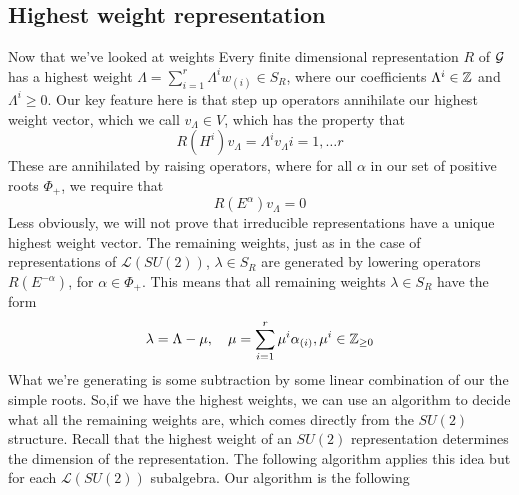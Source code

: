  \subsection{Highest weight representation}
 Now that we've looked at weights 
 Every finite dimensional representation $ R $ of $ \mathcal{ G } $ 
 has a highest weight $ \Lambda = \sum _{ i = 1 } ^ r \Lambda ^ i w _{ \left( i  \right)  }  
 \in S _ R $, where our coefficients $ \Lambda^ i \in \mathbb{Z}  $ and 
 $ \Lambda ^ i \ge  0 $. 
 Our key feature here is that step up operators 
 annihilate our highest weight vector, which 
 we call $ v _{ \Lambda } \in V $, which has 
 the property that 
 \[
  R \left( H ^ i  \right)  v _{ \Lambda } = \Lambda ^ i v _{ \Lambda } i  = 1, \dots r 
 \] These are annihilated by raising operators, 
 where for all $ \alpha $ in our set of positive roots $ \Phi  _ + $, 
 we require that 
 \[
  R \left( E ^{ \alpha }  \right)  v _{ \Lambda } = 0 
 \] Less obviously, we will not prove that irreducible 
 representations have a unique highest weight vector. 
 The remaining weights, just as in the case of 
 representations of $ \mathcal{ L } \left( SU ( 2)   \right)  $,
 $ \lambda \in  S_ R $ are generated by lowering operators 
 $ R \left( E ^{ - \alpha }  \right)  $, for $ \alpha \in \Phi   _ + $. 
This means that all remaining weights $ \lambda \in S _ R $
have the form 
\[
	\lambda = \Lambda - \mu , \quad \mu = \sum_{ i = 1 } ^ r \mu ^ i \alpha _{ \left( i  \right)  } , 
	\mu ^ i \in \mathbb{Z} _{ \geq 0 } 
\] What we're generating is some subtraction by
some linear combination of our the simple roots. So,if we have the highest weights, 
we can use an algorithm to decide what all the remaining weights are, 
which comes directly from the $ SU( 2) $ structure. 
Recall that the highest weight of an $ SU ( 2) $ representation 
determines the dimension of the representation. 
The following algorithm applies this idea but 
for each $ \mathcal{ L } \left( SU ( 2)  \right)  $ subalgebra. 
Our algorithm is the following 

